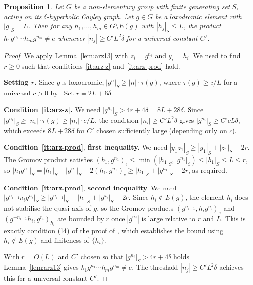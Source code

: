 \documentclass[12pt]{amsart}
\theoremstyle{plain}
\newtheorem{proposition}[theorem]{Proposition}
\theoremstyle{definition}
\begin{document}
\begin{proposition}\label{prop:explicit}
Let $G$ be a non-elementary group with finite generating set $S$, acting on its
$\delta$-hyperbolic Cayley graph. Let $g \in G$ be a loxodromic element with
$|g|_S = L$. Then for any $h_1, \ldots, h_m \in G \setminus E(g)$ with
$|h_j|_S \leq L$, the product $h_1 g^{n_1} \cdots h_m g^{n_m} \neq e$ whenever
$|n_j| \geq C' L^2 \delta$ for a universal constant $C'$.
\end{proposition}

\begin{proof}
We apply Lemma~\ref{lem:arz13} with $z_i = g^{n_i}$ and $y_i = h_i$.
We need to find $r \geq 0$ such that conditions~\ref{it:arz-z}
and~\ref{it:arz-prod} hold.

\medskip\noindent\textbf{Setting $r$.}
Since $g$ is loxodromic, $|g^n|_S \geq |n|\cdot\tau(g)$, where
$\tau(g) \geq c/L$ for a universal $c > 0$ by \cite[Prop.~3.2]{Alonso}.
Set $r = 2L + 6\delta$.

\medskip\noindent\textbf{Condition~\ref{it:arz-z}.}
We need $|g^{n_i}|_S > 4r + 4\delta = 8L + 28\delta$.
Since $|g^{n_i}|_S \geq |n_i|\cdot\tau(g) \geq |n_i|\cdot c/L$, the condition
$|n_i| \geq C'L^2\delta$ gives $|g^{n_i}|_S \geq C'cL\delta$, which exceeds
$8L + 28\delta$ for $C'$ chosen sufficiently large (depending only on $c$).

\medskip\noindent\textbf{Condition~\ref{it:arz-prod}, first inequality.}
We need $|y_1 z_1|_S \geq |y_1|_S + |z_1|_S - 2r$.
The Gromov product satisfies
$(h_1, g^{n_1})_e \leq \min(|h_1|_S, |g^{n_1}|_S) \leq |h_1|_S \leq L \leq r$,
so $|h_1 g^{n_1}|_S = |h_1|_S + |g^{n_1}|_S - 2(h_1,g^{n_1})_e \geq |h_1|_S + |g^{n_1}|_S - 2r$,
as required.

\medskip\noindent\textbf{Condition~\ref{it:arz-prod}, second inequality.}
We need $|g^{n_{i-1}} h_i g^{n_i}|_S \geq |g^{n_{i-1}}|_S + |h_i|_S + |g^{n_i}|_S - 2r$.
Since $h_i \notin E(g)$, the element $h_i$ does not stabilise the quasi-axis of $g$,
so the Gromov products $(g^{n_{i-1}}, h_i g^{n_i})_e$ and $(g^{-n_{i-1}}h_i, g^{n_i})_{h_i}$
are bounded by $r$ once $|g^{n_j}|$ is large relative to $r$ and $L$.
This is exactly condition (14) of the proof of \cite[Theorem~1]{Arz01}, which establishes
the bound using $h_i \notin E(g)$ and finiteness of $\{h_i\}$.

\medskip\noindent
With $r = O(L)$ and $C'$ chosen so that $|g^{n_i}|_S > 4r + 4\delta$ holds, 
Lemma~\ref{lem:arz13} gives $h_1 g^{n_1} \cdots h_m g^{n_m} \neq e$.
The threshold $|n_j| \geq C'L^2\delta$ achieves this for a universal constant $C'$.
\end{proof}
\end{document}
